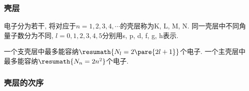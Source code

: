 \documentclass[hidelinks]{ctexart}
\begin{document}
\subsubsection{壳层} %
\label{ssub:壳层}

电子分为若干, 将对应于$n=1,2,3,4,\cdots$的壳层称为K, L, M, N. 同一壳层中不同角量子数分为不同, $l=0,1,2,3,4,5$分别用s, p, d, f, g, h表示.
\par
一个支壳层中最多能容纳$\resumath{N_l = 2\pare{2l+1}}$个电子. 一个主壳层中最多能容纳$\resumath{N_n = 2n^2}$个电子.


\subsubsection{壳层的次序} %
\label{ssub:壳层的次序}
\end{document}
